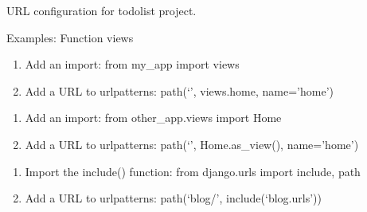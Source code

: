 \documentclass[letterpaper,10pt,english]{sphinxmanual}
\begin{document}
\begin{fulllineitems}
\label{\detokenize{todolist:todolist.urls.some_func}}
\pysigstartsignatures
{}
\pysigstopsignatures
\sphinxAtStartPar
URL configuration for todolist project.
\begin{description}
\sphinxAtStartPar
{}

\end{description}

\sphinxAtStartPar
Examples:
Function views
\begin{enumerate}
%
\item {} 
\sphinxAtStartPar
Add an import:  from my\_app import views

\item {} 
\sphinxAtStartPar
Add a URL to urlpatterns:  path(‘’, views.home, name=’home’)

\end{enumerate}
\begin{description}
\begin{enumerate}
%
\item {} 
\sphinxAtStartPar
Add an import:  from other\_app.views import Home

\item {} 
\sphinxAtStartPar
Add a URL to urlpatterns:  path(‘’, Home.as\_view(), name=’home’)

\end{enumerate}

\begin{enumerate}
%
\item {} 
\sphinxAtStartPar
Import the include() function: from django.urls import include, path

\item {} 
\sphinxAtStartPar
Add a URL to urlpatterns:  path(‘blog/’, include(‘blog.urls’))

\end{enumerate}

\end{description}

\end{fulllineitems}
\end{document}
